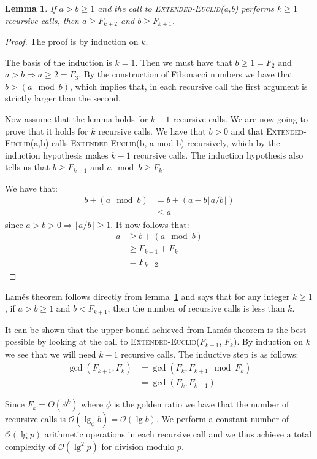 \documentclass[a4paper,oneside,article,11pt]{memoir}
\newtheorem{lemma}{Lemma}
\begin{document}
\begin{lemma}
\label{lemma:ee-rec}
If $a > b \geq 1$ and the call to \textsc{Extended-Euclid}(a,b) performs $k \geq 1$ recursive calls, then $a \geq F_{k+2}$ and $b \geq F_{k+1}$.
\end{lemma}
\begin{proof}
The proof is by induction on $k$.

The basis of the induction is $k=1$. Then we must have that $b \geq 1 = F_2$ and $a > b \Rightarrow a \geq 2 = F_3$. By the construction of Fibonacci numbers we have that $b > (a \mod b)$, which implies that, in each recursive call the first argument is strictly larger than the second.

Now assume that the lemma holds for $k-1$ recursive calls. We are now going to prove that it holds for $k$ recursive calls. We have that $b > 0$ and that \textsc{Extended-Euclid}(a,b) calls \textsc{Extended-Euclid}(b, a mod b) recursively, which by the induction hypothesis makes $k-1$ recursive calls. The induction hypothesis also tells us that $b \geq F_{k+1}$ and $a \mod b \geq F_k$.

We have that:
\begin{align*}
b+(a\mod b) &= b + (a-b\lfloor a/b \rfloor) \\
&\leq a
\end{align*}
since $a > b > 0 \Rightarrow \lfloor a/b \rfloor \geq 1$. It now follows that:
\begin{align*}
a &\geq b + (a \mod b) \\
&\geq F_{k+1} + F_k \\
&= F_{k+2}
\end{align*}
\end{proof}

Lamés theorem follows directly from lemma~\ref{lemma:ee-rec} and says that for any integer $k\geq 1$, if $a > b \geq 1$ and $b < F_{k+1}$, then the number of recursive calls is less than $k$.

It can be shown that the upper bound achieved from Lamés theorem is the best possible by looking at the call to \textsc{Extended-Euclid}($F_{k+1}$, $F_k$). By induction on $k$ we see that we will need $k-1$ recursive calls.
The inductive step is as follows:
\begin{align*}
\gcd(F_{k+1}, F_k) &= \gcd(F_k, F_{k+1} \mod F_k)\\
&= \gcd(F_k, F_{k-1})
\end{align*}

Since $F_k = \Theta(\phi^k)$ where $\phi$ is the golden ratio we have that the number of recursive calls is $\mathcal{O}(\lg_{\phi} b) = \mathcal{O}(\lg b)$. We perform a constant number of $\mathcal{O}(\lg p)$ arithmetic operations in each recursive call and we thus achieve a total complexity of $\mathcal{O}(\lg^2 p)$ for division modulo $p$.


\end{document}
